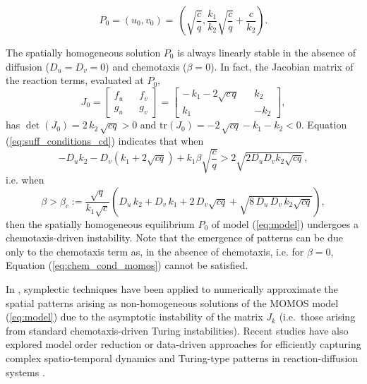 \documentclass{article}
\newcommand{\jac}{J_{k}}
\begin{document}
\begin{equation*}
  P_0=(u_0,v_0)=\,\left( \sqrt{\dfrac{c}{q}}, \dfrac{k_1}{k_2} \sqrt{\frac{c}{q}} +\dfrac{c}{k_2} \right).
 \end{equation*}

 The spatially homogeneous solution $P_0$ is always linearly stable in the absence of diffusion ($D_u=D_v=0$) and chemotaxis ($\beta=0$). In fact, the Jacobian matrix of the reaction terms, evaluated at $P_0$,
\begin{equation*}
 \label{J_Momos}
     J_{0}=\left[ 
     \begin{array}{ccc}
        f_u 
        && f_v \\
        g_u  && g_v
     \end{array}\right]=\left[ 
     \begin{array}{ccc}
        -\,k_1 -2\sqrt{c\,q} 
        && k_2 \\
        k_1  && -k_2
     \end{array}\right],
 \end{equation*}
 has  $\det (J_{0})=2\,k_2\,\sqrt{cq}>0$ and ${\mathrm{tr}}(J_{0})=-2\,\sqrt{cq}-k_1-k_2 <0$.
 Equation 
(\ref{eq:suff_conditions_cd}) indicates that when 
\begin{equation}\label{eq:chem_cond_momos}
 -D_u k_2 - D_v (k_1+2 \sqrt{cq}) + k_1 \beta \sqrt{\frac{c}{q}} > 2\sqrt{ 2 D_u D_v k_2 \sqrt{cq}},     
 \end{equation}
 i.e. when 
 \begin{equation}\label{bifurcation_curve}
    \beta> \beta_c:= \displaystyle \frac{\sqrt{q}}{k_1\sqrt{c}}\left(D_u\,k_2+D_v\,k_1+2\,D_v\sqrt{cq}+\sqrt{8\,D_u\,D_v\,k_2\sqrt{cq}} \right),
    \end{equation}
    then the spatially homogeneous equilibrium $P_0$ of model (\ref{eq:model}) undergoes {a} chemotaxis-driven instability. Note that the emergence of patterns can be due only to the chemotaxis term as, in the absence of chemotaxis, i.e. for $\beta=0$, Equation (\ref{eq:chem_cond_momos}) cannot be satisfied.

 In \cite{noi}, symplectic techniques have been applied to numerically approximate the spatial patterns arising as non-homogeneous solutions of the MOMOS model (\ref{eq:model}) due to the asymptotic instability of the matrix $\jac$ {(i.e.~those arising from standard chemotaxis-driven Turing instabilities)}. Recent studies have also explored model order reduction or data-driven approaches for efficiently capturing complex spatio-temporal dynamics and Turing-type patterns in reaction-diffusion systems \cite{BMS2021, AMS2023, AMS2024}.
\end{document}
